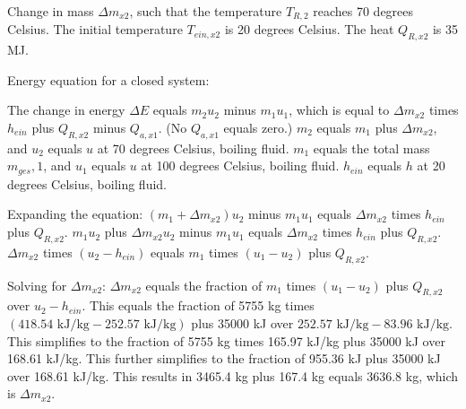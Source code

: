 Change in mass \( \Delta m_{x2} \), such that the temperature \( T_{R,2} \) reaches 70 degrees Celsius.
The initial temperature \( T_{ein, x2} \) is 20 degrees Celsius.
The heat \( Q_{R, x2} \) is 35 MJ.

Energy equation for a closed system:

The change in energy \( \Delta E \) equals \( m_2 u_2 \) minus \( m_1 u_1 \), which is equal to \( \Delta m_{x2} \) times \( h_{ein} \) plus \( Q_{R, x2} \) minus \( Q_{a, x1} \).
(No \( Q_{a, x1} \) equals zero.)
\( m_2 \) equals \( m_1 \) plus \( \Delta m_{x2} \), and \( u_2 \) equals \( u \) at 70 degrees Celsius, boiling fluid.
\( m_1 \) equals the total mass \( m_{ges}, 1 \), and \( u_1 \) equals \( u \) at 100 degrees Celsius, boiling fluid.
\( h_{ein} \) equals \( h \) at 20 degrees Celsius, boiling fluid.

Expanding the equation:
\( (m_1 + \Delta m_{x2}) u_2 \) minus \( m_1 u_1 \) equals \( \Delta m_{x2} \) times \( h_{ein} \) plus \( Q_{R, x2} \).
\( m_1 u_2 \) plus \( \Delta m_{x2} u_2 \) minus \( m_1 u_1 \) equals \( \Delta m_{x2} \) times \( h_{ein} \) plus \( Q_{R, x2} \).
\( \Delta m_{x2} \) times \( (u_2 - h_{ein}) \) equals \( m_1 \) times \( (u_1 - u_2) \) plus \( Q_{R, x2} \).

Solving for \( \Delta m_{x2} \):
\( \Delta m_{x2} \) equals the fraction of \( m_1 \) times \( (u_1 - u_2) \) plus \( Q_{R, x2} \) over \( u_2 - h_{ein} \).
This equals the fraction of 5755 kg times \( (418.54 \text{ kJ/kg} - 252.57 \text{ kJ/kg}) \) plus 35000 kJ over \( 252.57 \text{ kJ/kg} - 83.96 \text{ kJ/kg} \).
This simplifies to the fraction of 5755 kg times 165.97 kJ/kg plus 35000 kJ over 168.61 kJ/kg.
This further simplifies to the fraction of 955.36 kJ plus 35000 kJ over 168.61 kJ/kg.
This results in 3465.4 kg plus 167.4 kg equals 3636.8 kg, which is \( \Delta m_{x2} \).